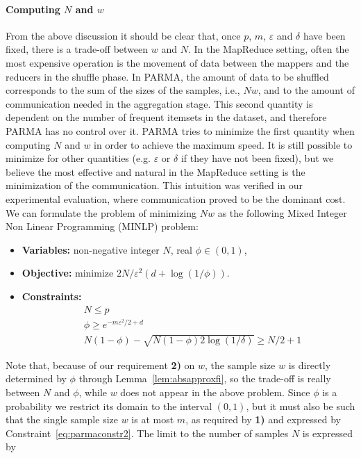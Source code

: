 \paragraph*{Computing $N$ and $w$} From the above discussion it should be clear
that, once $p$, $m$, $\varepsilon$ and $\delta$ have been fixed, there is a
trade-off between $w$ and $N$. In the MapReduce setting, often the most expensive
operation is the movement of data between the mappers and the reducers in the
shuffle phase. In PARMA, the amount of data to be shuffled corresponds to the
sum of the sizes of the samples, i.e., $Nw$, and to the amount of
communication needed in the aggregation stage. This second quantity is dependent
on the number of frequent itemsets in the dataset, and therefore PARMA has no
control over it. PARMA tries to minimize the first quantity when computing $N$ and
$w$ in order to achieve the maximum speed. It is still possible to minimize for
other quantities (e.g. $\varepsilon$ or $\delta$ if they have not been fixed),
but we believe the most effective and natural in the MapReduce setting is the
minimization of the communication.  This intuition was verified in our
experimental evaluation, where communication proved to be the dominant cost. We
can formulate the problem of minimizing $Nw$ as the following Mixed Integer Non
Linear Programming (MINLP) problem:
\begin{itemize}
  \item {\bf Variables:} non-negative integer $N$, real $\phi\in(0,1)$,
  \item {\bf Objective:} minimize $2N/\varepsilon^2 (d+\log(1/\phi))$.
  \item {\bf Constraints:}
    \begin{align}
      &N \le p \label{eq:parmaconstr1}\\
      &\phi \ge e^{-m\varepsilon^2/2 + d} \label{eq:parmaconstr2}\\
      &N(1-\phi)-\sqrt{N(1-\phi)2\log(1/\delta)} \ge N/2 + 1 \label{eq:parmaconstr3}
    \end{align}
\end{itemize}
Note that, because of our requirement {\bf 2)} on $w$, the sample size $w$ is directly
determined by $\phi$ through Lemma~\ref{lem:absapproxfi}, so the trade-off is
really between $N$ and $\phi$, while $w$ does not appear in the above problem.
Since $\phi$ is a probability we restrict its
domain to the interval $(0,1)$, but it must also be such that the single sample size
$w$ is at most $m$, as required by {\bf 1)} and expressed by
Constraint~\eqref{eq:parmaconstr2}. The limit to the number of samples $N$ is expressed by
